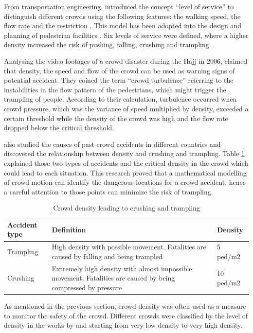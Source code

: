 From transportation engineering, \citet{Fruin1970} introduced the concept ``level of service'' to distinguish different crowds using the following features: the walking speed, the flow rate and the restriction \citep{Challenger2009}. This model has been adopted into the design and planning of pedestrian facilities \citep{Shiwakoti2008,Ye2008}. Six levels of service were defined, where a higher density increased the risk of pushing, falling, crushing and trampling.

Analysing the video footages of a crowd disaster during the Hajj in 2006, \citet{Helbing2007} claimed that density, the speed and flow of the crowd can be used as warning signs of potential accident. They coined the term ``crowd turbulence'' referring to the instabilities in the flow pattern of the pedestrians, which might trigger the trampling of people. According to their calculation, turbulence occurred when crowd pressure, which was the variance of speed multiplied by density, exceeded a certain threshold while the density of the crowd was high and the flow rate dropped below the critical threshold.

\citet{Lee2005} also studied the causes of past crowd accidents in different countries and discovered the relationship between density and crushing and trampling. Table \ref{table:densityCrushingTrampling} explained those two types of accidents and the critical density in the crowd which could lead to each situation. This research proved that a mathematical modelling of crowd motion can identify the dangerous locations for a crowd accident, hence a careful attention to those points can minimize the risk of trampling.

\begin{table}
	\caption{Crowd density leading to crushing and trampling}
	\label{table:densityCrushingTrampling}
	\centering
	\begin{tabular}{|l|p{9.5cm}|l|}
		\hline
		\textbf{Accident type} & \textbf{Definition} & \textbf{Density} \\ \hline \hline
		Trampling & High density with possible movement. Fatalities are caused by falling and being trampled & 5 ped/m2 \\ \hline
		Crushing & Extremely high density with almost impossible movement. Fatalities are caused by being compressed by pressure & 10 ped/m2 \\ \hline
	\end{tabular}
\end{table}

As mentioned in the previous section, crowd density was often used as a measure to monitor the safety of the crowd. Different crowds were classified by the level of density in the works by \citet{Marana1997} and \citet{Weppner2013} starting from very low density to very high density.

